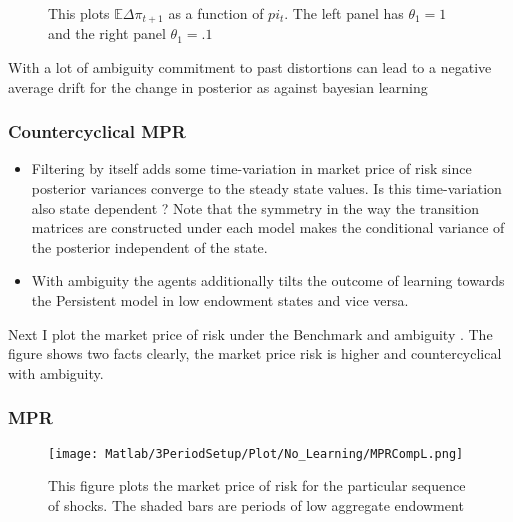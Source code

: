 \documentclass{beamer}
\theoremstyle{Definition}
\begin{document}
\begin{frame}
\begin{figure}[htbp]
  \centering
\caption{This plots $\mathbb{E}\Delta \pi_{t+1}$ as a function of $pi_t$. The left panel has $\theta_1=1$ and the right panel $\theta_1=.1$}
  \label{fig:LearningDynamics}
\end{figure}
With a lot of ambiguity commitment to past distortions can lead to a
negative average drift for the change in posterior as against bayesian learning
\end{frame}
\begin{frame}
\frametitle{Countercyclical MPR}

\begin{itemize}
\item Filtering by itself adds some time-variation in market price of
  risk since posterior variances converge to the steady state
  values. Is this time-variation also state dependent ? Note that the
  symmetry in the way the transition matrices are constructed under
  each model makes the conditional variance of the posterior
  independent of the state.

\item With ambiguity the agents additionally tilts the outcome of
  learning towards the Persistent model in low endowment states and
  vice versa.
\end{itemize}
 Next I plot the market price of risk under the Benchmark and ambiguity . The figure shows two facts clearly, the market price risk is higher and countercyclical with ambiguity.

\end{frame}

\begin{frame}
\frametitle{MPR}
\begin{figure}[htbp]
\centering
	  \texttt{[image: Matlab/3PeriodSetup/Plot/No\_Learning/MPRCompL.png]}

	\caption{This figure plots the market price of risk for the particular sequence of shocks. The shaded bars are periods of low aggregate endowment}
	\label{fig:MPRCompL}
\end{figure} 

\end{frame}
\end{document}
